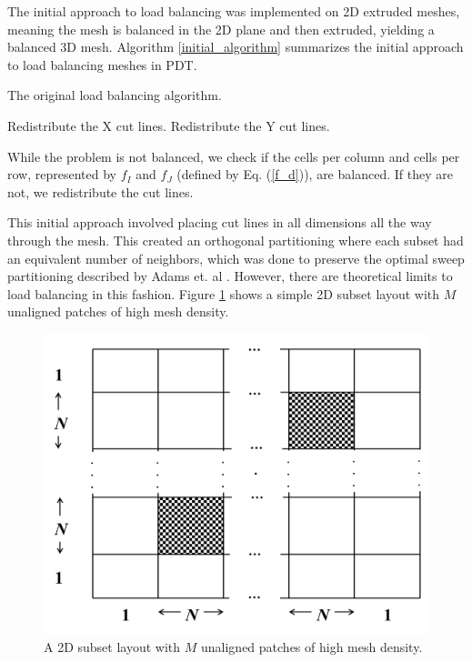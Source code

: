 \documentclass[letterpaper]{mandc2019}
\begin{document}
The initial approach to load balancing was implemented on 2D extruded meshes, meaning the mesh is balanced in the 2D plane and then extruded, yielding a balanced 3D mesh. Algorithm \ref{initial_algorithm} summarizes the initial approach to load balancing meshes in PDT.

\begin{algorithm}[htb]
\caption{The original load balancing algorithm.}
\label{initial_algorithm}
\begin{algorithmic}

    \STATE Redistribute the X cut lines.
  \ENDIF
  	\STATE Redistribute the Y cut lines.
  \ENDIF
\ENDWHILE
\end{algorithmic}
\end{algorithm}
While the problem is not balanced, we check if the cells per column and cells per row, represented by $f_I$ and $f_J$ (defined by Eq. (\ref{f_d})), are balanced. If they are not, we redistribute the cut lines. 

This initial approach involved placing cut lines in all dimensions all the way through the mesh. This created an orthogonal partitioning where each subset had an equivalent number of neighbors, which was done to preserve the optimal sweep partitioning described by Adams et. al \cite{mpadams2015}. However, there are theoretical limits to load balancing in this fashion. Figure \ref{2dgeneral} shows a simple 2D subset layout with $M$ unaligned patches of high mesh density.

\begin{figure}[H]
\centering
\includegraphics[scale=0.6]{figures/2dgeneral.png}
\caption{A 2D subset layout with $M$ unaligned patches of high mesh density.}
\label{2dgeneral}
\end{figure}
\end{document}
